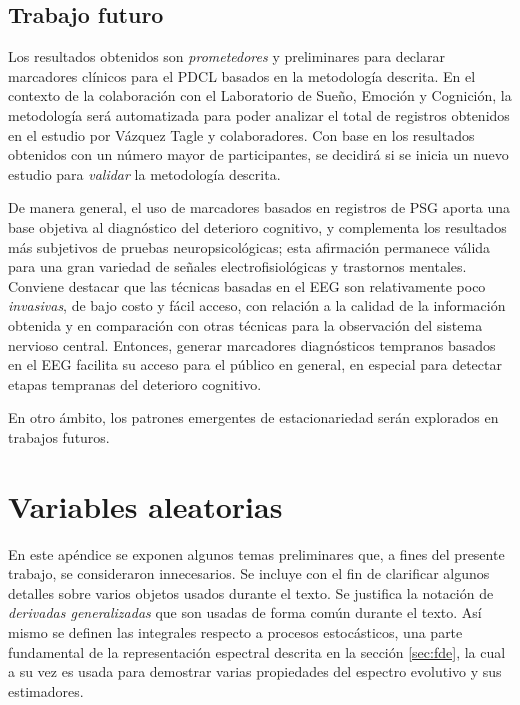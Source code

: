 \documentclass[12pt,letterpaper]{book}
\begin{document}
\section{Trabajo futuro}

Los resultados obtenidos son \textit{prometedores} y preliminares para declarar marcadores clínicos para el PDCL basados en la metodología descrita.
%
En el contexto de la colaboración con el Laboratorio de Sueño, Emoción y Cognición, la metodología será automatizada para poder analizar el total de registros obtenidos en el estudio por Vázquez Tagle y colaboradores.
%
Con base en los resultados obtenidos con un número mayor de participantes, se decidirá si se inicia un nuevo estudio para \textit{validar} la metodología descrita.

De manera general, el uso de marcadores basados en registros de PSG aporta una base objetiva al diagnóstico del deterioro cognitivo, y complementa los resultados más subjetivos de pruebas neuropsicológicas; esta afirmación permanece válida para una gran variedad de señales electrofisiológicas y trastornos mentales.
%
Conviene destacar que las técnicas basadas en el EEG son relativamente poco \textit{invasivas}, de bajo costo y fácil acceso, con relación a la calidad de la información obtenida y en comparación con otras técnicas para la observación del sistema nervioso central.
%
Entonces, generar marcadores diagnósticos tempranos basados en el EEG facilita su acceso para el público en general, en especial para detectar etapas tempranas del deterioro cognitivo.

En otro ámbito, los patrones emergentes de estacionariedad serán explorados en trabajos futuros.


\appendix

\chapter{Variables aleatorias}
\label{apendice:medidas}

En este apéndice se exponen algunos temas preliminares que, a fines del presente trabajo, se consideraron innecesarios.
%
Se incluye con el fin de clarificar algunos detalles sobre varios objetos usados durante el texto.
%
Se justifica la notación de \textit{derivadas generalizadas} que son usadas de forma común durante el texto.
%
Así mismo se definen las integrales respecto a procesos estocásticos, una parte fundamental de la representación espectral descrita en la sección \ref{sec:fde}, la cual a su vez es usada para demostrar varias propiedades del espectro evolutivo y sus estimadores.
\end{document}
